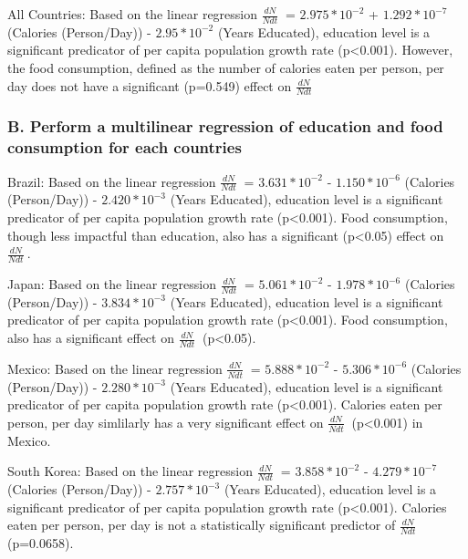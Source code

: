 \documentclass[]{article}
\begin{document}
All Countries: Based on the linear regression \(\frac{dN}{Ndt}\ \) =
\(2.975*10^{-2}\) + \(1.292*10^{-7}\) (Calories (Person/Day)) -
\(2.95*10^{-2}\) (Years Educated), education level is a significant
predicator of per capita population growth rate (p\textless{}0.001).
However, the food consumption, defined as the number of calories eaten
per person, per day does not have a significant (p=0.549) effect on
\(\frac{dN}{Ndt}\ \)

\subsubsection{B. Perform a multilinear regression of education and food
consumption for each
countries}\label{b.-perform-a-multilinear-regression-of-education-and-food-consumption-for-each-countries}

Brazil: Based on the linear regression \(\frac{dN}{Ndt}\ \) =
\(3.631*10^{-2}\) - \(1.150*10^{-6}\) (Calories (Person/Day)) -
\(2.420*10^{-3}\) (Years Educated), education level is a significant
predicator of per capita population growth rate (p\textless{}0.001).
Food consumption, though less impactful than education, also has a
significant (p\textless{}0.05) effect on \(\frac{dN}{Ndt}\ \).

Japan: Based on the linear regression \(\frac{dN}{Ndt}\ \) =
\(5.061*10^{-2}\) - \(1.978*10^{-6}\) (Calories (Person/Day)) -
\(3.834*10^{-3}\) (Years Educated), education level is a significant
predicator of per capita population growth rate (p\textless{}0.001).
Food consumption, also has a significant effect on \(\frac{dN}{Ndt}\ \)
(p\textless{}0.05).

Mexico: Based on the linear regression \(\frac{dN}{Ndt}\ \) =
\(5.888*10^{-2}\) - \(5.306*10^{-6}\) (Calories (Person/Day)) -
\(2.280*10^{-3}\) (Years Educated), education level is a significant
predicator of per capita population growth rate (p\textless{}0.001).
Calories eaten per person, per day simlilarly has a very significant
effect on \(\frac{dN}{Ndt}\ \) (p\textless{}0.001) in Mexico.

South Korea: Based on the linear regression \(\frac{dN}{Ndt}\ \) =
\(3.858*10^{-2}\) - \(4.279*10^{-7}\) (Calories (Person/Day)) -
\(2.757*10^{-3}\) (Years Educated), education level is a significant
predicator of per capita population growth rate (p\textless{}0.001).
Calories eaten per person, per day is not a statistically significant
predictor of \(\frac{dN}{Ndt}\ \) (p=0.0658).
\end{document}
